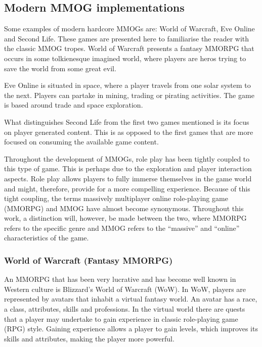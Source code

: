 \subsection{Modern MMOG implementations}
\label{modern_mmogs}

Some examples of modern hardcore MMOGs are: World of Warcraft, Eve Online and Second Life. These games are presented here to familiarise the reader with the classic MMOG tropes. World of Warcraft presents a fantasy MMORPG that occurs in some tolkienesque imagined world, where players are heros trying to save the world from some great evil.

Eve Online is situated in space, where a player travels from one solar system to the next. Players can partake in mining, trading or pirating activities. The game is based around trade and space exploration.

What distinguishes Second Life from the first two games mentioned is its focus on player generated content. This is as opposed to the first games that are more focused on consuming the available game content.

Throughout the development of MMOGs, role play has been tightly coupled to this type of game. This is perhaps due to the exploration and player interaction aspects. Role play allows players to fully immerse themselves in the game world and might, therefore, provide for a more compelling experience. Because of this tight coupling, the terms massively multiplayer online role-playing game (MMORPG) and MMOG have almost become synonymous. Throughout this work, a distinction will, however, be made between the two, where MMORPG refers to the specific genre and MMOG refers to the ``massive'' and ``online'' characteristics of the game.

\subsubsection{World of Warcraft (Fantasy MMORPG)}

An MMORPG that has been very lucrative and has become well known in Western culture is Blizzard's World of Warcraft (WoW). In WoW, players are represented by avatars that inhabit a virtual fantasy world. An avatar has a race, a class, attributes, skills and professions. In the virtual world there are quests that a player may undertake to gain experience in classic role-playing game (RPG) style. Gaining experience allows a player to gain levels, which improves its skills and attributes, making the player more powerful.

